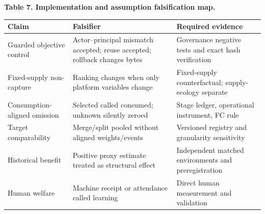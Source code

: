 \documentclass[
  11pt]{article}
\begin{document}
\textbf{Table 7. Implementation and assumption falsification map.}

\begin{longtable}[]{@{}
  >{\raggedright\arraybackslash}p{}
  >{\raggedright\arraybackslash}p{}
  >{\raggedright\arraybackslash}p{}@{}}
\toprule\noalign{}
\begin{minipage}[b]{\linewidth}\raggedright
Claim
\end{minipage} & \begin{minipage}[b]{\linewidth}\raggedright
Falsifier
\end{minipage} & \begin{minipage}[b]{\linewidth}\raggedright
Required evidence
\end{minipage} \\
\midrule\noalign{}
\endhead
\bottomrule\noalign{}
\endlastfoot
Guarded objective control & Actor--principal mismatch accepted; reuse
accepted; rollback changes bytes & Governance negative tests and exact
hash verification \\
Fixed-supply non-capture & Ranking changes when only platform variables
change & Fixed-supply counterfactual; supply-ecology separate \\
Consumption-aligned omission & Selected called consumed; unknown
silently zeroed & Stage ledger, operational instrument, FC rule \\
Target comparability & Merge/split pooled without aligned weights/events
& Versioned registry and granularity sensitivity \\
Historical benefit & Positive proxy estimate treated as structural
effect & Independent matched environments and preregistration \\
Human welfare & Machine receipt or attendance called learning & Direct
human measurement and validation \\
\end{longtable}
\end{document}
